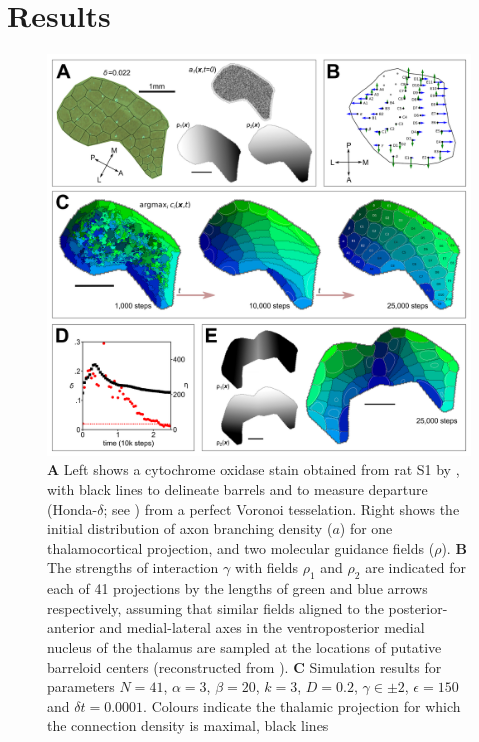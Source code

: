 \documentclass[9pt,lineno]{elife}
\begin{document}
\section{Results}

\begin{figure}
\begin{fullwidth}
\includegraphics[width=\linewidth]{./MainFig_superlowres.png}
\caption{\textbf{A} Left shows a cytochrome oxidase stain obtained from rat S1
  by \cite{zheng_signal_2001}, with black lines to delineate barrels and to
  measure departure (Honda-$\delta$; see \citealp{senft_mouse_1991}) from a
  perfect Voronoi tesselation. Right shows the initial distribution of axon
  branching density ($a$) for one thalamocortical projection, and two
  molecular guidance fields ($\rho$). \textbf{B} The strengths of interaction
  $\gamma$ with fields $\rho_1$ and $\rho_2$ are indicated for each of 41
  projections by the lengths of green and blue arrows respectively, assuming
  that similar fields aligned to the posterior-anterior and medial-lateral
  axes in the ventroposterior medial nucleus of the thalamus are sampled at
  the locations of putative barreloid centers (reconstructed from
  \citealp{haidarliu_size_2001}). \textbf{C} Simulation results for parameters
  $N=41$, $\alpha=3$, $\beta=20$, $k=3$, $D=0.2$, $\gamma\in\pm 2$,
  $\epsilon=150$ and $\delta{t}=0.0001$. Colours indicate the thalamic
  projection for which the connection density is maximal, black lines
}
\end{fullwidth}
\end{figure}
\end{document}
